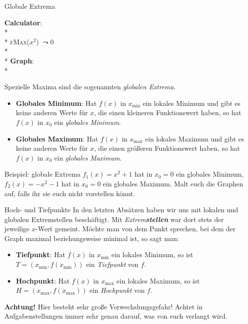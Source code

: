 \begin{bla}{Globale Extrema}
  \begin{marginfigure}
    \begin{tcolorbox}[colback=white!95!black,colframe=white!75!black,title=CAS:,arc=0mm]
      \begin{scriptsize}
        \textbf{Calculator}: \\*
         \\*
          \hfill \textsc{fMax}(\( x^2 \)) \( \leadsto 0 \) \\* \ \\*
        \textbf{Graph}: \\*
      \end{scriptsize}
    \end{tcolorbox}
  \end{marginfigure}
  Spezielle Maxima sind die sogenannten \emph{globalen Extrema}.
  \begin{itemize}
    \item \textbf{Globales Minimum}: Hat $f(x)$ in $x_{\min}$ ein lokales Minimum und gibt es keine anderen Werte für $x$, die einen kleineren Funktionswert haben, so hat $f(x)$ in $x_0$ ein \emph{globales Minimum}.
    \item \textbf{Globales Maximum}: Hat $f(x)$ in $x_{\max}$ ein lokales Maximum und gibt es keine anderen Werte für $x$, die einen größeren Funktionswert haben, so hat $f(x)$ in $x_0$ ein \emph{globales Maximum}.
  \end{itemize}
\end{bla}

\begin{bla}{Beispiel: globale Extrema}
  $f_1(x)=x^2+1$ hat in $x_0=0$ ein globales Minimum, \\ $f_2(x)=-x^2-1$ hat in $x_0=0$ ein globales Maximum. Malt euch die Graphen auf, falls ihr sie euch nicht vorstellen könnt.
\end{bla}

\begin{bla}{Hoch- und Tiefpunkte}
  In den letzten Absätzen haben wir uns mit lokalen und globalen Extremstellen beschäftigt. Mit \emph{Extrem\textbf{stellen}} war dort stets der jeweilige $x$-Wert gemeint. Möchte man von dem Punkt sprechen, bei dem der Graph maximal beziehungsweise minimal ist, so sagt man:
  \begin{itemize}
    \item \textbf{Tiefpunkt}: Hat $f(x)$ in $x_{\min}$ ein lokales Minimum, so ist $T=(x_{\min},f(x_{\min}))$ ein \emph{Tiefpunkt} von $f$.
    \item \textbf{Hochpunkt}: Hat $f(x)$ in $x_{\max}$ ein lokales Maximum, so ist $H=(x_{\max},f(x_{\max}))$ ein \emph{Hochpunkt} von $f$.
  \end{itemize}
  \textcolor{red!75!black}{\textbf{Achtung!}} Hier besteht sehr große Verwechslungsgefahr! Achtet in Aufgabenstellungen immer sehr genau darauf, was von euch verlangt wird.
\end{bla}

